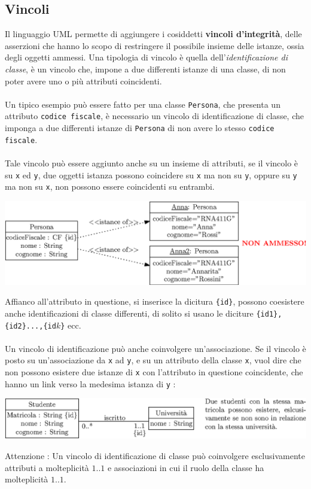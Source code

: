 \documentclass[12pt, letterpaper]{article}
\newcommand{\code}[1]{\colorbox{light-gray}{\texttt{#1}}}
\newcommand{\acc}{\\\hphantom{}\\}
\begin{document}
\subsection{Vincoli}
Il linguaggio UML permette di aggiungere i cosiddetti \textbf{vincoli d'integrità}, delle asserzioni che hanno lo 
scopo di restringere il possibile insieme delle istanze, ossia degli oggetti ammessi. Una tipologia di vincolo è 
quella dell'\textit{identificazione di classe}, è un vincolo che, impone a due differenti istanze di una classe, 
di non poter avere uno o più attributi coincidenti.\acc 
Un tipico esempio può essere fatto per una classe \code{Persona}, che presenta un attributo \code{codice fiscale},
è necessario un vincolo di identificazione di classe, che imponga a due differenti istanze di \code{Persona} di non 
avere lo stesso \code{codice fiscale}. \acc Tale vincolo può essere aggiunto anche su un insieme di attributi, 
se il vincolo è su \code{x} ed \code{y}, due oggetti istanza possono coincidere su \code{x} ma non su \code{y}, oppure 
su \code{y} ma non su \code{x}, non possono essere coincidenti su entrambi.\begin{center}
    \includegraphics[width=\textwidth ]{images/identificazione.eps}
\end{center} 
Affianco all'attributo in questione, si inserisce la dicitura \code{\{id\}}, possono coesistere anche identificazioni 
di classe differenti, di solito si usano le diciture \code{\{id1\}, \{id2\}...,\{id$k$\}} ecc.\acc Un vincolo di 
identificazione può anche coinvolgere un'associazione. Se il vincolo è posto su un'associazione da 
\code{x} ad \code{y}, e su un attributo
della classe \code{x}, 
vuol dire che non possono esistere due istanze di \code{x} con l'attributo in questione coincidente, che hanno un 
link verso la medesima istanza di \code{y} :\begin{center}
    \includegraphics[width=\textwidth ]{images/vincoloAss.eps}
\end{center} 
Attenzione : Un vincolo di identificazione di classe può coinvolgere esclusivamente attributi a molteplicità 
$1..1$ e associazioni in cui il ruolo della classe ha molteplicità $1..1$.
\end{document}
